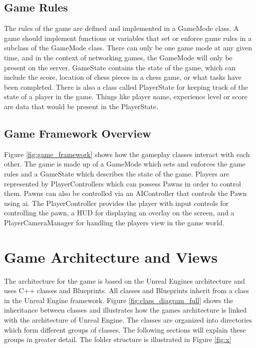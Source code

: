 \subsection{Game Rules}
The rules of the game are defined and implemented in a GameMode class. A game should implement functions or variables that set or enforce game rules in a subclass of the GameMode class. There can only be one game mode at any given time, and in the context of networking games, the GameMode will only be present on the server. GameState contains the state of the game, which can include the score, location of chess pieces in a chess game, or what tasks have been completed. There is also a class called PlayerState for keeping track of the state of a player in the game. Things like player name, experience level or score are data that would be present in the PlayerState.

\subsection{Game Framework Overview}
Figure \ref{fig:game_framework} shows how the gameplay classes interact with each other. The game is made up of a GameMode which sets and enforces the game rules and a GameState which describes the state of the game. Players are represented by PlayerControllers which can possess Pawns in order to control them. Pawns can also be controlled via an AIController that controls the Pawn using \gls{ai}. The PlayerController provides the player with input controls for controlling the pawn, a HUD for displaying an overlay on the screen, and a PlayerCameraManager for handling the players view in the game world.



\section{Game Architecture and Views}
The architecture for the game is based on the Unreal Engines architecture and uses C++ classes and Blueprints. All classes and Blueprints inherit from a class in the Unreal Engine framework. Figure \ref{fig:class_diagram_full} shows the inheritance between classes and illustrates how the games architecture is linked with the architecture of Unreal Engine. The classes are organized into directories which form different groups of classes. The following sections will explain these groups in greater detail. The folder structure is illustrated in Figure \ref{fig:x} 

